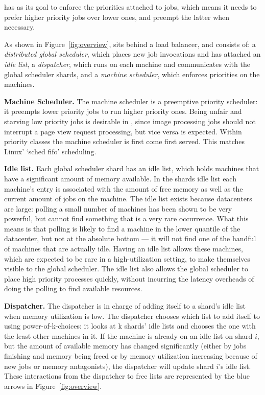 \Sys{} has as its goal to enforce the priorities attached to jobs, which means
it needs to prefer higher priority jobs over lower ones, and preempt the latter
when necessary.
  

As shown in Figure~\ref{fig:overview}, \sys{} sits behind a load balancer, and
consists of: a \textit{distributed global scheduler}, which places new job
invocations and has attached an \textit{idle list}, a \textit{dispatcher},
which runs on each machine and communicates with the global scheduler shards,
and a \textit{machine scheduler}, which enforces priorities on the machines.


\textbf{Machine Scheduler.}
The machine scheduler is a preemptive priority scheduler: it preempts lower
priority jobs to run higher priority ones. Being unfair and starving low
priority jobs is desirable in \sys{}, since image processing jobs should not
interrupt a page view request processing, but vice versa is expected. Within
priority classes the machine scheduler is first come first served. This matches
Linux' `sched fifo' scheduling.


\textbf{Idle list.}
Each global scheduler shard has an idle list, which holds machines that
have a significant amount of memory available. In the shards idle list each
machine's entry is associated with the amount of free memory as well as the
current amount of jobs on the machine. The idle list exists because datacenters
are large: polling a small number of machines has been shown to be very
powerful, but cannot find something that is a very rare occurrence.
What this means is that polling is likely to find a machine in the lower
quantile of the datacenter, but not at the absolute bottom --- it will not find
one of the handful of machines that are actually idle. Having an idle list
allows these machines, which are expected to be rare in a high-utilization
setting, to make themselves visible to the global scheduler. The idle list also
allows the global scheduler to place high priority processes quickly, without
incurring the latency overheads of doing the polling to find available
resources.


\textbf{Dispatcher.}
The dispatcher is in charge of adding itself to a shard's idle list when memory
utilization is low. The dispatcher chooses which list to add itself to using
power-of-k-choices: it looks at k shards' idle lists and chooses the one with
the least other machines in it. If the machine is already on an idle list on
shard $i$, but the amount of available memory has changed significantly (either
by jobs finishing and memory being freed or by memory utilization increasing
because of new jobs or memory antagonists), the dispatcher will update shard
$i$'s idle list. These interactions from the dispatcher to free lists are
represented by the blue arrows in Figure~\ref{fig:overview}.

